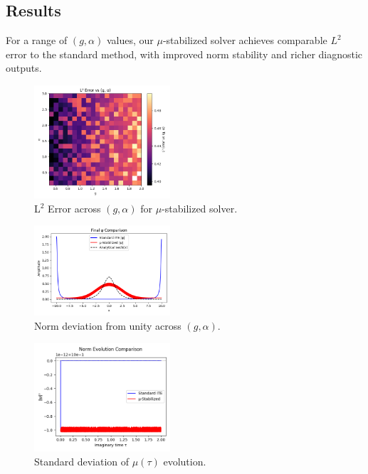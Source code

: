 \documentclass[11pt]{article}
\begin{document}
\subsection{Results}
For a range of $(g, \alpha)$ values, our $\mu$-stabilized solver achieves comparable $L^2$ error to the standard method, with improved norm stability and richer diagnostic outputs.

\begin{figure}[h!]
    \centering
    \includegraphics[width=0.45\textwidth]{Figure4.png}
    \caption{L$^2$ Error across $(g, \alpha)$ for $\mu$-stabilized solver.}
\end{figure}

\begin{figure}[h!]
    \centering
    \includegraphics[width=0.45\textwidth]{Figure_alpha.png}
    \caption{Norm deviation from unity across $(g, \alpha)$.}
\end{figure}

\begin{figure}[h!]
    \centering
    \includegraphics[width=0.45\textwidth]{Figure_beta.png}
    \caption{Standard deviation of $\mu(\tau)$ evolution.}
\end{figure}
\end{document}
